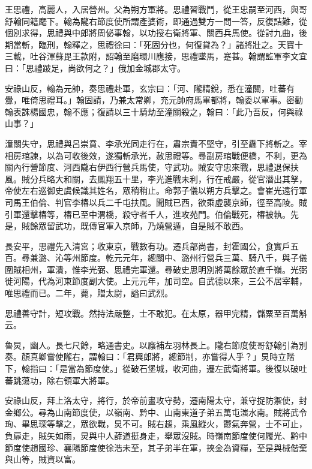 
\begin{pinyinscope}

 王思禮，高麗人，入居營州。父為朔方軍將。思禮習戰鬥，從王忠嗣至河西，與哥舒翰同籍麾下。翰為隴右節度使所謂產婆術，即通過雙方一問一答，反復詰難，從個別求得，思禮與中郎將周佖事翰，以功授右衛將軍、關西兵馬使。從討九曲，後期當斬，臨刑，翰釋之，思禮徐曰：「死固分也，何復貸為？」諸將壯之。天寶十三載，吐谷渾蘇毘王款附，詔翰至磨環川應接，思禮墜馬，蹇甚。翰謂監軍李文宜曰：「思禮跛足，尚欲何之？」俄加金城郡太守。



 安祿山反，翰為元帥，奏思禮赴軍，玄宗曰：「河、隴精銳，悉在潼關，吐蕃有釁，唯倚思禮耳。」翰固請，乃兼太常卿，充元帥府馬軍都將，翰委以軍事。密勸翰表誅楊國忠，翰不應；復請以三十騎劫至潼關殺之，翰曰：「此乃吾反，何與祿山事？」



 潼關失守，思禮與呂崇賁、李承光同走行在，肅宗責不堅守，引至纛下將斬之。宰相房琯諫，以為可收後效，遂獨斬承光，赦思禮等。尋副房琯戰便橋，不利，更為關內行營節度、河西隴右伊西行營兵馬使，守武功。賊安守忠來戰，思禮退保扶風。賊分兵略大和關，去鳳翔五十里，李光進戰未利，行在戒嚴，從官潛出其孥，帝使左右巡御史虞候識其姓名，眾稍稍止。命郭子儀以朔方兵擊之。會崔光遠行軍司馬王伯倫、判官李椿以兵二千屯扶風。聞賊已西，欲乘虛襲京師，徑至高陵。賊引軍還擊椿等，椿已至中渭橋，殺守者千人，進攻苑門。伯倫戰死，椿被執。先是，賊餘眾留武功，既傳官軍入京師，乃燒營遁，自是賊不敢西。



 長安平，思禮先入清宮；收東京，戰數有功。遷兵部尚書，封霍國公，食實戶五百。尋兼潞、沁等州節度。乾元元年，總關中、潞州行營兵三萬、騎八千，與子儀圍賊相州，軍潰，惟李光弼、思禮完軍還。尋破史思明別將萬餘眾於直千嶺。光弼徙河陽，代為河東節度副大使。上元元年，加司空。自武德以來，三公不居宰輔，唯思禮而已。二年，薨，贈太尉，謚曰武烈。



 思禮善守計，短攻戰。然持法嚴整，士不敢犯。在太原，器甲完精，儲粟至百萬斛云。



 魯炅，幽人。長七尺餘，略通書史。以廕補左羽林長上。隴右節度使哥舒翰引為別奏。顏真卿嘗使隴右，謂翰曰：「君興郎將，總節制，亦嘗得人乎？」炅時立階下，翰指曰：「是當為節度使。」從破石堡城，收河曲，遷左武衛將軍。後復以破吐蕃跳蕩功，除右領軍大將軍。



 安祿山反，拜上洛太守，將行，於帝前畫攻守勢，遷南陽太守，兼守捉防禦使，封金鄉公。尋為山南節度使，以嶺南、黔中、山南東道子弟五萬屯滍水南。賊將武令珣、畢思琛等擊之，眾欲戰，炅不可。賊右趨，乘風縱火，鬱氣奔營，士不可止，負扉走，賊矢如雨，炅與中人薛道挺身走，舉眾沒賊。時嶺南節度使何履光、黔中節度使趙國珍、襄陽節度使徐浩未至，其子弟半在軍，挾金為資糧，至是與械偕棄與山等，賊資以富。




\end{pinyinscope}
